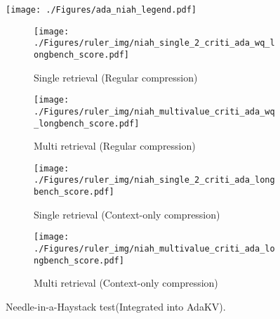 \begin{figure*}[t!]
	\centering
	\begin{minipage}{\linewidth}
		\centering
		\texttt{[image: ./Figures/ada\_niah\_legend.pdf]}
	\end{minipage}
	\begin{subfigure}[b]{0.24\linewidth}
		\centering
		\texttt{[image: ./Figures/ruler\_img/niah\_single\_2\_criti\_ada\_wq\_longbench\_score.pdf]}
		\vspace{-0.4cm}
		\caption{\centering  Single retrieval \newline (Regular compression)}
		\label{subfig:adakv_single_regular}
	\end{subfigure}
	\begin{subfigure}[b]{0.24\linewidth}
		\centering
		\texttt{[image: ./Figures/ruler\_img/niah\_multivalue\_criti\_ada\_wq\_longbench\_score.pdf]}
		\vspace{-0.4cm}
		\caption{\centering  Multi retrieval \newline(Regular compression)}
		\label{subfig:adakv_multi_regular}
	\end{subfigure}
	\begin{subfigure}[b]{0.24\linewidth}
		\centering
		\texttt{[image: ./Figures/ruler\_img/niah\_single\_2\_criti\_ada\_longbench\_score.pdf]}
		\vspace{-0.4cm}
		\caption{\centering Single retrieval \newline (Context-only compression)}
		\label{subfig:adakv_single_context}
	\end{subfigure}
	\begin{subfigure}[b]{0.24\linewidth}
		\centering
		\texttt{[image: ./Figures/ruler\_img/niah\_multivalue\_criti\_ada\_longbench\_score.pdf]}
		\vspace{-0.4cm}
		\caption{\centering  Multi retrieval \newline (Context-only compression)}
		\label{subfig:adakv_multi_context}
	\end{subfigure}
	\vspace{-0.2cm}
	\caption{Needle-in-a-Haystack test(Integrated into AdaKV). }
	\vspace{-0.2cm}
\end{figure*}


